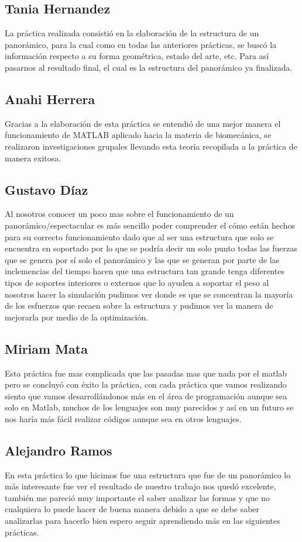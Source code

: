 \documentclass{article}
\begin{document}
\subsection{Tania  Hernandez}
La práctica realizada consistió en la elaboración de la estructura de un panorámico, para la cual como en todas las anteriores prácticas, se buscó la información respecto a su forma geométrica, estado del arte, etc. Para así pasarnos al resultado final, el cual es la estructura del panorámico ya finalizada.
\subsection{Anahi Herrera}
Gracias a la elaboración de esta práctica se entendió de una mejor manera el funcionamiento de MATLAB aplicado hacia la materia de biomecánica, se realizaron investigaciones grupales llevando esta teoría recopilada a la práctica de manera exitosa. 
\newpage
\subsection{Gustavo  Díaz}
Al nosotros conocer un poco mas sobre el funcionamiento de un panorámico/espectacular es más sencillo poder comprender el cómo están hechos para su correcto funcionamiento dado que al ser una estructura que solo se encuentra en soportado por lo que se podría decir un solo punto todas las fuerzas que se genera por sí solo el panorámico y las que se generan por parte de las inclemencias del tiempo hacen que una estructura tan grande tenga diferentes tipos de soportes interiores o externos que lo ayuden a soportar el peso al nosotros hacer la simulación pudimos ver donde es que se concentran la mayoría de los esfuerzos que recaen sobre la estructura y pudimos ver la manera de mejorarla por medio de la optimización.
\subsection{Miriam  Mata}
Esta práctica fue mas complicada que las pasadas mas que nada por el matlab pero se concluyó con éxito la práctica, con cada práctica que vamos realizando siento que vamos desarrollándonos más en el área de programación aunque sea solo en Matlab, muchos de los lenguajes son muy parecidos y así en un futuro se nos haría más fácil realizar códigos aunque sea en otros lenguajes.
\subsection{Alejandro Ramos}
En esta práctica lo que hicimos fue una estructura que fue de un panorámico lo más interesante fue ver el resultado de nuestro trabajo nos quedó excelente, también me pareció muy importante el saber analizar las formas y que no cualquiera lo puede hacer de buena manera debido a que se debe saber analizarlas para hacerlo bien espero seguir aprendiendo más en las siguientes prácticas.


\end{document}
